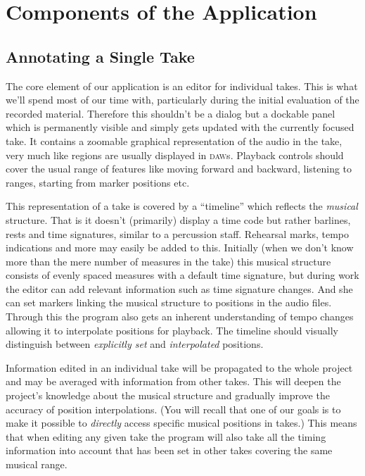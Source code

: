 \documentclass[11pt,a4paper]{article}
\begin{document}
\section{Components of the Application}

\subsection{Annotating a Single Take}
The core element of our application is an editor for individual takes.
This is what we'll spend most of our time with, particularly during the initial
evaluation of the recorded material.
Therefore this shouldn't be a dialog but a dockable panel which is permanently
visible and simply gets updated with the currently focused take.
It contains a zoomable graphical representation of the audio in the take, very
much like regions are usually displayed in \textsc{daw}s.
Playback controls should cover the usual range of features like moving forward
and backward, listening to ranges, starting from marker positions etc.

This representation of a take is covered by a “timeline” which reflects the
\emph{musical} structure.
That is it doesn't (primarily) display a time code but rather barlines, rests
and time signatures, similar to a percussion staff.
Rehearsal marks, tempo indications and more may easily be added to this.
Initially (when we don't know more than the mere number of measures in the take)
this musical structure consists of evenly spaced measures with a default time
signature, but during work the editor can add relevant information such as time
signature changes.
And she can set markers linking the musical structure to positions in the audio
files.
Through this the program also gets an inherent understanding of tempo changes
allowing it to interpolate positions for playback.
The timeline should visually distinguish between \emph{explicitly set} and
\emph{interpolated} positions.

Information edited in an individual take will be propagated to the whole project
and may be averaged with information from other takes.
This will deepen the project's knowledge about the musical structure and
gradually improve the accuracy of position interpolations.
(You will recall that one of our goals is to make it possible to \emph{directly}
access specific musical positions in takes.)
This means that when editing any given take the program will also take all the
timing information into account that has been set in other takes covering the
same musical range.
\end{document}
